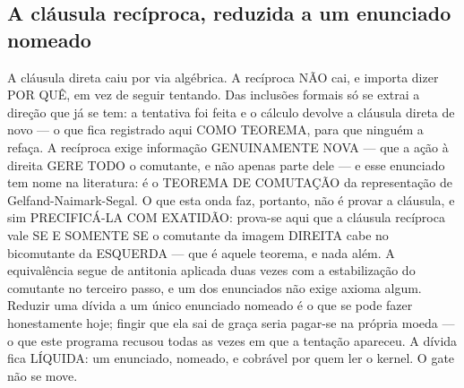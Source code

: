 \documentclass[11pt]{article}
\theoremstyle{definition}\newtheorem{deriv}{Derivação}
\begin{document}
\subsection*{A cl\'ausula rec\'iproca, reduzida a um enunciado nomeado}A cl\'ausula direta caiu por via alg\'ebrica. A rec\'iproca N\~AO cai, e importa dizer POR QU\^E, em vez de seguir tentando. Das inclus\~oes formais s\'o se extrai a dire\c{c}\~ao que j\'a se tem: a tentativa foi feita e o c\'alculo devolve a cl\'ausula direta de novo --- o que fica registrado aqui COMO TEOREMA, para que ningu\'em a refa\c{c}a. A rec\'iproca exige informa\c{c}\~ao GENUINAMENTE NOVA --- que a a\c{c}\~ao \`a direita GERE TODO o comutante, e n\~ao apenas parte dele --- e esse enunciado tem nome na literatura: \'e o TEOREMA DE COMUTA\c{C}\~AO da representa\c{c}\~ao de Gelfand-Naimark-Segal. O que esta onda faz, portanto, n\~ao \'e provar a cl\'ausula, e sim PRECIFIC\'A-LA COM EXATID\~AO: prova-se aqui que a cl\'ausula rec\'iproca vale SE E SOMENTE SE o comutante da imagem DIREITA cabe no bicomutante da ESQUERDA --- que \'e aquele teorema, e nada al\'em. A equival\^encia segue de antitonia aplicada duas vezes com a estabiliza\c{c}\~ao do comutante no terceiro passo, e um dos enunciados n\~ao exige axioma algum. Reduzir uma d\'ivida a um \'unico enunciado nomeado \'e o que se pode fazer honestamente hoje; fingir que ela sai de gra\c{c}a seria pagar-se na pr\'opria moeda --- o que este programa recusou todas as vezes em que a tenta\c{c}\~ao apareceu. A d\'ivida fica L\'IQUIDA: um enunciado, nomeado, e cobr\'avel por quem ler o kernel. O gate n\~ao se move.
\end{document}
